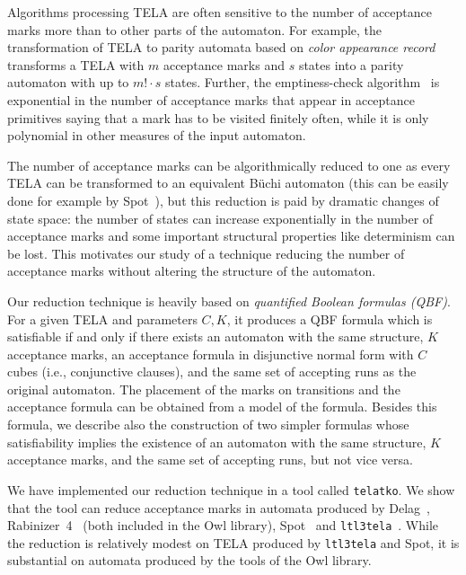 \documentclass[a4paper,UKenglish,cleveref,autoref,thm-restate]{lipics-v2021}
\newcommand{\telatko}{\texttt{telatko}\xspace}
\begin{document}
Algorithms processing TELA are often sensitive to the number of
acceptance marks more than to other parts of the automaton. For
example, the transformation of TELA to parity automata based on
\emph{color appearance record}~\cite{renkin.20.atva} transforms a TELA
with $m$ acceptance marks and $s$ states into a parity automaton with
up to $m!\cdot s$ states. Further, the emptiness-check
algorithm~\cite{baier.19.atva} is exponential in the number of
acceptance marks that appear in acceptance primitives saying that a
mark has to be visited finitely often, while it is only polynomial in
other measures of the input automaton.

The number of acceptance marks can be algorithmically reduced to one
as every TELA can be transformed to an equivalent Büchi automaton
(this can be easily done for example by Spot~\cite{duret.16.atva2}),
but this reduction is paid by dramatic changes of state space: the
number of states can increase exponentially in the number of
acceptance marks and some important structural properties like
determinism can be lost. This motivates our study of a technique
reducing the number of acceptance marks without altering the structure
of the automaton.

Our reduction technique is heavily based on \emph{quantified Boolean
  formulas (QBF)}. For a given TELA and parameters $C,K$, it produces
a QBF formula which is satisfiable if and only if there exists an
automaton with the same structure, $K$ acceptance marks, an acceptance
formula in disjunctive normal form with $C$ cubes (i.e., conjunctive
clauses), and the same set of accepting runs as the original
automaton. The placement of the marks on transitions and the
acceptance formula can be obtained from a model of the
formula. Besides this formula, we describe also the construction of
two simpler formulas whose satisfiability implies the existence of an
automaton with the same structure, $K$ acceptance marks, and the same
set of accepting runs, but not vice versa.

We have implemented our reduction technique in a tool called
\telatko. We show that the tool can reduce acceptance marks in
automata produced by Delag~\cite{muller.17.gandalf},
Rabinizer~4~\cite{kretinsky.18.cav} (both included in the Owl
library), Spot~\cite{duret.16.atva2} and
\texttt{ltl3tela}~\cite{major.19.atva}.  While the reduction is
relatively modest on TELA produced by \texttt{ltl3tela} and Spot, it
is substantial on automata produced by the tools of the Owl library.
\end{document}
